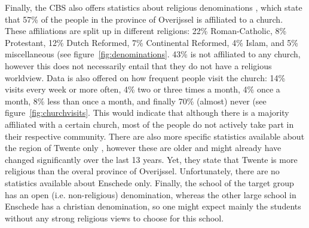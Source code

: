 Finally, the CBS also offers statistics about religious denominations \cite{cbsdenom}, which state that 57\% of the people in the province of Overijssel is affiliated to a church. These affiliations are split up in different religions: 22\% Roman-Catholic, 8\% Protestant, 12\% Dutch Reformed, 7\% Continental Reformed, 4\% Islam, and 5\% miscellaneous (see figure~\ref{fig:denominations}. 43\% is not affiliated to any church, however this does not necessarily entail that they do not have a religious worldview. Data is also offered on how frequent people visit the church: 14\% visits every week or more often, 4\% two or three times a month, 4\% once a month, 8\% less than once a month, and finally 70\% (almost) never (see figure~\ref{fig:churchvisits}. This would indicate that although there is a majority affiliated with a certain church, most of the people do not actively take part in their respective community. There are also more specific statistics available about the region of Twente only \cite{cbsdenomold}, however these are older and might already have changed significantly over the last 13 years. Yet, they state that Twente is more religious than the overal province of Overijssel. Unfortunately, there are no statistics available about Enschede only. Finally, the school of the target group has an open (i.e. non-religious) denomination, whereas the other large school in Enschede has a christian denomination, so one might expect mainly the students without any strong religious views to choose for this school.

